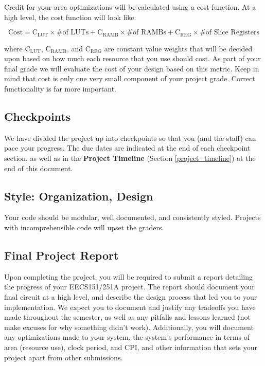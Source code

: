 \documentclass[11pt]{article}
\begin{document}
Credit for your area optimizations will be calculated using a cost function. At a high level, the cost function will look like:

\[\mathrm{Cost}=\mathrm{C_{LUT}} \times \text{\# of LUTs} + \mathrm{C_{RAMB}} \times \text{\#of RAMBs} + \mathrm{C_{REG}} \times \text{\#of Slice Registers} \]

where $\mathrm{C_{LUT}}$, $\mathrm{C_{RAMB}}$, and $\mathrm{C_{REG}}$ are constant value weights that will be decided upon based on how much each resource that you use should cost. As part of your final grade we will evaluate the cost of your design based on this metric. Keep in mind that cost is only one very small component of your project grade. Correct functionality is far more important.

\subsection{Checkpoints}
\label{checkoff}

We have divided the project up into checkpoints so that you (and the staff) can pace your progress. The due dates are indicated at the end of each checkpoint section, as well as in the \textbf{Project Timeline} (Section \ref{project_timeline}) at the end of this document.

\subsection{Style: Organization, Design}
\label{style}
Your code should be modular, well documented, and consistently styled. Projects with incomprehensible code will upset the graders.

\subsection{Final Project Report}
Upon completing the project, you will be required to submit a report detailing the progress of your EECS151/251A project. The report should document your final circuit at a high level, and describe the design process that led you to your implementation.  We expect you to document and justify any tradeoffs you have made throughout the semester, as well as any pitfalls and lessons learned (not make excuses for why something didn't work).  Additionally, you will document any optimizations made to your system, the system's performance in terms of area (resource use), clock period, and CPI, and other information that sets your project apart from other submissions.
\end{document}

